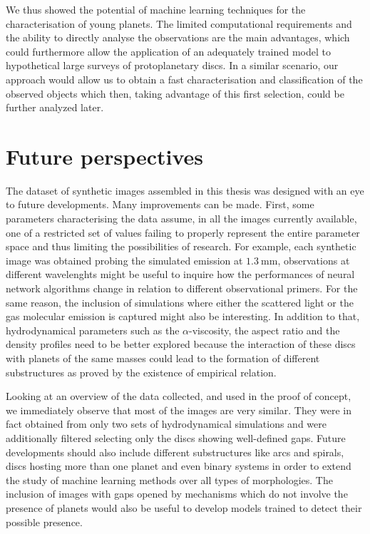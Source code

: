\documentclass[a4paper,10pt]{report}
\begin{document}
We thus showed the potential of machine learning techniques for the characterisation of 
young planets. The limited computational requirements and the ability to
directly analyse the observations are the main advantages, which could
furthermore allow the application of an adequately trained model to hypothetical large surveys
of protoplanetary discs. In a similar scenario, our approach would allow us to obtain a fast characterisation
and classification of the observed objects which then, taking advantage of this first selection,
could be further analyzed later.

\section{Future perspectives}

The dataset of synthetic images assembled in this thesis was designed with an 
eye to future developments. Many improvements can be made. First, some parameters characterising the data
assume, in all the images currently available, one of a restricted set of values failing to properly represent 
the entire parameter space and thus limiting the possibilities of research.
For example, each synthetic image was obtained probing the simulated emission at $\SI{1.3}{\mm}$,
observations at different wavelenghts might be useful to inquire how the
performances of neural network algorithms change in relation to different observational primers.
For the same reason, the inclusion of simulations where either the scattered light or the gas molecular
emission is captured might also be interesting. In addition to that, hydrodynamical parameters such as 
the $\alpha$-viscosity, the aspect ratio and the density profiles need to be better explored 
because the interaction of these discs with planets of the same masses
could lead to the formation of different substructures as proved by the existence of \citet{kanagawa}
empirical relation.

Looking at an overview of the data collected, and used in the proof of concept, we immediately observe that
most of the images are very similar. They were in fact obtained from only two sets of hydrodynamical simulations
and were additionally filtered selecting only the discs showing well-defined gaps. 
Future developments should also include different substructures like arcs and spirals, discs 
hosting more than one planet and even binary systems in order to extend the study of machine learning methods
over all types of morphologies. The inclusion of images with gaps opened by mechanisms which do not involve the presence of
planets would also be useful to develop models trained to detect their possible presence.
\end{document}

